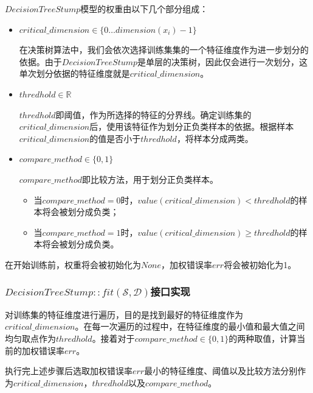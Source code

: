 \documentclass{paper}
\begin{document}
$DecisionTreeStump$模型的权重由以下几个部分组成：

\begin{itemize}
    \item $critical\_dimension \in \{0 \dots dimension(x_i)-1\}$
    
            在决策树算法中，我们会依次选择训练集集的一个特征维度作为进一步划分的依据。由于$DecisionTreeStump$是单层的决策树，因此仅会进行一次划分，这单次划分依据的特征维度就是$critical\_dimension$。
    
    \item $thredhold \in \mathbb{R}$

            $thredhold$即阈值，作为所选择的特征的分界线。确定训练集的$critical\_dimension$后，使用该特征作为划分正负类样本的依据。根据样本$critical\_dimension$的值是否小于$thredhold$，将样本分成两类。

    \item $compare\_method \in \{0, 1\}$
    
            $compare\_method$即比较方法，用于划分正负类样本。
            
            \begin{itemize}
            
                \item 当$compare\_method = 0$时，$value(critical\_dimension) < thredhold$的样本将会被划分成负类；
            
                \item 当$compare\_method = 1$时，$value(critical\_dimension) \geq thredhold$的样本将会被划分成负类。
            \end{itemize}
\end{itemize}

在开始训练前，权重将会被初始化为$None$，加权错误率$err$将会被初始化为1。

\subsubsection{$DecisionTreeStump::fit(\mathcal{S},\mathcal{D})$接口实现}  \label{d:f}

对训练集的特征维度进行遍历，目的是找到最好的特征维度作为$critical\_dimension$。在每一次遍历的过程中，在特征维度的最小值和最大值之间均匀取点作为$thredhold$。接着对于$compare\_method \in \{0, 1\}$的两种取值，计算当前的加权错误率$err$。

执行完上述步骤后选取加权错误率$err$最小的特征维度、阈值以及比较方法分别作为$critical\_dimension$，$thredhold$以及$compare\_method$。
\end{document}

